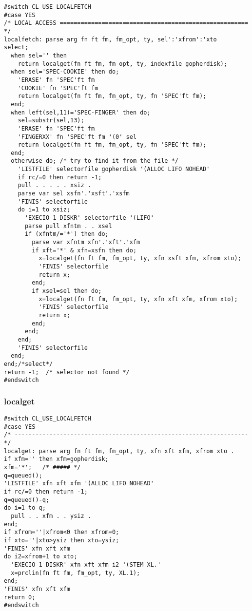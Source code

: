 \begin{verbatim}
#switch CL_USE_LOCALFETCH
#case YES
/* LOCAL ACCESS ====================================================== */
localfetch: parse arg fn ft fm, fm_opt, ty, sel':'xfrom':'xto
select;
  when sel='' then
    return localget(fn ft fm, fm_opt, ty, indexfile gopherdisk);
  when sel='SPEC-COOKIE' then do;
    'ERASE' fn 'SPEC'ft fm
    'COOKIE' fn 'SPEC'ft fm
    return localget(fn ft fm, fm_opt, ty, fn 'SPEC'ft fm);
  end;
  when left(sel,11)='SPEC-FINGER' then do;
    sel=substr(sel,13);
    'ERASE' fn 'SPEC'ft fm
    'FINGERXX' fn 'SPEC'ft fm '(0' sel
    return localget(fn ft fm, fm_opt, ty, fn 'SPEC'ft fm);
  end;
  otherwise do; /* try to find it from the file */
    'LISTFILE' selectorfile gopherdisk '(ALLOC LIFO NOHEAD'
    if rc/=0 then return -1;
    pull . . . . . xsiz .
    parse var sel xsfn'.'xsft'.'xsfm
    'FINIS' selectorfile
    do i=1 to xsiz;
      'EXECIO 1 DISKR' selectorfile '(LIFO'
      parse pull xfntm . . xsel
      if (xfntm/='*') then do;
        parse var xfntm xfn'.'xft'.'xfm
        if xft='*' & xfn=xsfn then do;
          x=localget(fn ft fm, fm_opt, ty, xfn xsft xfm, xfrom xto);
          'FINIS' selectorfile
          return x;
        end;
        if xsel=sel then do;
          x=localget(fn ft fm, fm_opt, ty, xfn xft xfm, xfrom xto);
          'FINIS' selectorfile
          return x;
        end;
      end;
    end;
    'FINIS' selectorfile
  end;
end;/*select*/
return -1;  /* selector not found */
#endswitch 
\end{verbatim}

\subsubsection{localget}

\def\LPtopF{localget}

\begin{verbatim}
#switch CL_USE_LOCALFETCH
#case YES
/* ------------------------------------------------------------------- */
localget: parse arg fn ft fm, fm_opt, ty, xfn xft xfm, xfrom xto .
if xfm='' then xfm=gopherdisk;
xfm='*';   /* ##### */
q=queued();
'LISTFILE' xfn xft xfm '(ALLOC LIFO NOHEAD'
if rc/=0 then return -1;
q=queued()-q;
do i=1 to q;
  pull . . xfm . . ysiz .
end;
if xfrom=''|xfrom<0 then xfrom=0;
if xto=''|xto>ysiz then xto=ysiz;
'FINIS' xfn xft xfm
do i2=xfrom+1 to xto;
  'EXECIO 1 DISKR' xfn xft xfm i2 '(STEM XL.'
  x=prclin(fn ft fm, fm_opt, ty, XL.1);
end;
'FINIS' xfn xft xfm
return 0;
#endswitch 
\end{verbatim}

